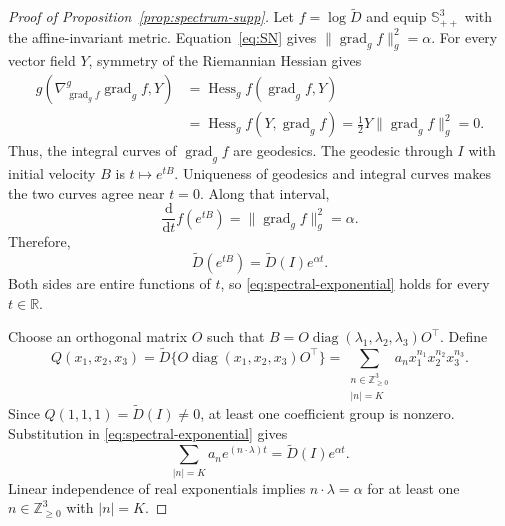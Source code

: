 \documentclass[12pt,a4paper]{article}
\theoremstyle{plain}
\theoremstyle{definition}
\newcommand{\R}{\mathbb{R}}
\newcommand{\Smat}{\mathbb{S}}
\begin{document}
\begin{proof}[Proof of Proposition~\ref{prop:spectrum-supp}]
    Let $f=\log\tilde D$ and equip $\Smat^3_{++}$ with the affine-invariant metric.
    Equation~\eqref{eq:SN} gives $\lVert\operatorname{grad}_g f\rVert_g^2=\alpha$.
    For every vector field $Y$, symmetry of the Riemannian Hessian gives
    \begin{equation*}
        \begin{split}
        g(\nabla^g_{\operatorname{grad}_g f}\operatorname{grad}_g f,Y)
        &=
        \operatorname{Hess}_g f(\operatorname{grad}_g f,Y)
        \\
        &=
        \operatorname{Hess}_g f(Y,\operatorname{grad}_g f)
        =
        \frac{1}{2}Y\lVert\operatorname{grad}_g f\rVert_g^2
        =0
        .
        \end{split}
    \end{equation*}
    Thus, the integral curves of $\operatorname{grad}_g f$ are geodesics.
    The geodesic through $I$ with initial velocity $B$ is $t\mapsto e^{tB}$.
    Uniqueness of geodesics and integral curves makes the two curves agree near $t=0$.
    Along that interval,
    \begin{equation*}
        \frac{\mathrm{d}}{\mathrm{d}t}f(e^{tB})
        =
        \lVert\operatorname{grad}_g f\rVert_g^2
        =
        \alpha
        .
    \end{equation*}
    Therefore,
    \begin{equation}
    \label{eq:spectral-exponential}
        \tilde{D}(e^{tB})
        =
        \tilde{D}(I)e^{\alpha t}
        .
    \end{equation}
    Both sides are entire functions of $t$, so \eqref{eq:spectral-exponential} holds for every $t\in\R$.

    Choose an orthogonal matrix $O$ such that $B=O\operatorname{diag}(\lambda_1,\lambda_2,\lambda_3)O^\top$.
    Define
    \begin{equation*}
        Q(x_1,x_2,x_3)
        =
        \tilde{D}\{O\operatorname{diag}(x_1,x_2,x_3)O^\top\}
        =
        \sum_{\substack{n\in\mathbb{Z}_{\ge0}^3\\|n|=K}}
        a_nx_1^{n_1}x_2^{n_2}x_3^{n_3}
        .
    \end{equation*}
    Since $Q(1,1,1)=\tilde{D}(I)\ne0$, at least one coefficient group is nonzero.
    Substitution in \eqref{eq:spectral-exponential} gives
    \begin{equation*}
        \sum_{|n|=K}a_ne^{(n\cdot\lambda)t}
        =
        \tilde{D}(I)e^{\alpha t}
        .
    \end{equation*}
    Linear independence of real exponentials implies $n\cdot\lambda=\alpha$ for at least one $n\in\mathbb{Z}_{\ge0}^3$ with $|n|=K$.


\end{proof}
\end{document}
